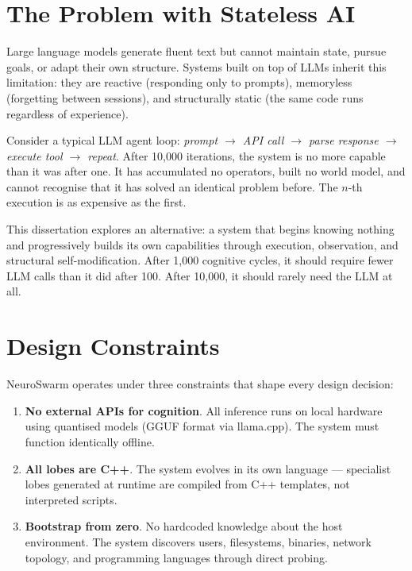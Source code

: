 \documentclass[12pt,a4paper]{report}
\begin{document}
\section{The Problem with Stateless AI}
Large language models generate fluent text but cannot maintain state, pursue goals, or adapt their own structure. Systems built on top of LLMs inherit this limitation: they are reactive (responding only to prompts), memoryless (forgetting between sessions), and structurally static (the same code runs regardless of experience).

Consider a typical LLM agent loop: \textit{prompt $\to$ API call $\to$ parse response $\to$ execute tool $\to$ repeat}. After 10{,}000 iterations, the system is no more capable than it was after one. It has accumulated no operators, built no world model, and cannot recognise that it has solved an identical problem before. The $n$-th execution is as expensive as the first.

This dissertation explores an alternative: a system that begins knowing nothing and progressively builds its own capabilities through execution, observation, and structural self-modification. After 1{,}000 cognitive cycles, it should require fewer LLM calls than it did after 100. After 10{,}000, it should rarely need the LLM at all.

\section{Design Constraints}
NeuroSwarm operates under three constraints that shape every design decision:

\begin{enumerate}
    \item \textbf{No external APIs for cognition}. All inference runs on local hardware using quantised models (GGUF format via llama.cpp). The system must function identically offline.
    \item \textbf{All lobes are C++}. The system evolves in its own language --- specialist lobes generated at runtime are compiled from C++ templates, not interpreted scripts.
    \item \textbf{Bootstrap from zero}. No hardcoded knowledge about the host environment. The system discovers users, filesystems, binaries, network topology, and programming languages through direct probing.
\end{enumerate}
\end{document}
